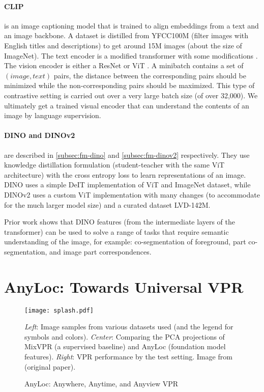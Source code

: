 \paragraph{CLIP \cite{Radford2021LearningTV}} is an image captioning
model that is trained to align embeddings from a text and an image
backbone. A dataset is distilled from YFCC100M
\cite{Thomee2015YFCC100M} (filter images with English titles and
descriptions) to get around 15M images (about the size of ImageNet).
The text encoder is a modified transformer with some modifications
\cite{Radford2019LanguageMA, Vaswani2017AttentionIA}. The vision
encoder is either a ResNet \cite{He2015DeepRL} or ViT
\cite{Dosovitskiy2020AnII}. A minibatch contains a set of $(image,
text)$ pairs, the distance between the corresponding pairs should be
minimized while the non-corresponding pairs should be maximized. This
type of contrastive setting is carried out over a very large batch
size (of over 32,000). We ultimately get a trained visual encoder that
can understand the contents of an image by language supervision.

\paragraph{DINO \cite{Caron2021EmergingPI} and DINOv2
\cite{Oquab2023DINOv2LR}} are described in \cref{subsec:fm-dino} and
\cref{subsec:fm-dinov2} respectively. They use knowledge distillation
formulation (student-teacher with the same ViT architecture) with the
cross entropy loss to learn representations of an image. DINO uses a
simple DeIT implementation of ViT and ImageNet dataset, while DINOv2
uses a custom ViT implementation with many changes (to accommodate for
the much larger model size) and a curated dataset LVD-142M.

Prior work \cite{Amir2021DeepVF} shows that DINO features (from the
intermediate layers of the transformer) can be used to solve a range
of tasks that require semantic understanding of the image, for
example: co-segmentation of foreground, part co-segmentation, and
image part correspondences.

\section{AnyLoc: Towards Universal VPR}

\begin{figure}
    \centering
    \texttt{[image: splash.pdf]}
    \caption{AnyLoc: Anywhere, Anytime, and Anyview VPR}
    \small
        \emph{Left}: Image samples from various datasets used (and the
        legend for symbols and colors). \emph{Center}: Comparing the
        PCA projections of MixVPR (a supervised baseline) and AnyLoc
        (foundation model features). \emph{Right}: VPR performance by
        the test setting. Image from \cite{Keetha2023AnyLocTU} 
        (original paper).
    \label{fig:anyloc}
\end{figure}

